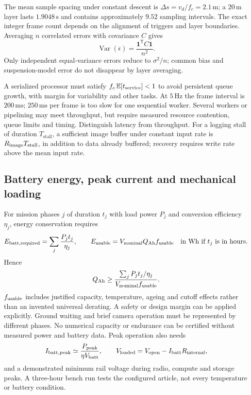 The mean sample spacing under constant descent is
$\Delta s=v_d/f_c=2.1\,\mathrm m$; a $20\,\mathrm m$ layer lasts
$1.9048\,\mathrm s$ and contains approximately $9.52$ sampling intervals.
The exact integer frame count depends on the alignment of triggers and
layer boundaries. Averaging $n$ correlated errors with covariance $C$
gives
\begin{equation}
 \operatorname{Var}(\overline\epsilon)=\frac{\boldsymbol1^{\mathsf T}C\boldsymbol1}{n^2}.
\end{equation}
Only independent equal-variance errors reduce to $\sigma^2/n$; common
bias and suspension-model error do not disappear by layer averaging.

A serialized processor must satisfy $f_c\,\mathbb E[t_{\rm service}]<1$
to avoid persistent queue growth, with margin for variability and other
tasks. At $5\,\mathrm{Hz}$ the frame interval is $200\,\mathrm{ms}$;
$250\,\mathrm{ms}$ per frame is too slow for one sequential worker.
Several workers or pipelining may meet throughput, but require measured
resource contention, queue limits and timing. Distinguish latency from
throughput. For a logging stall of duration $T_{\mathrm{stall}}$, a sufficient
image buffer under constant input rate is $R_{\rm image}T_{\mathrm{stall}}$,
in addition to data already buffered; recovery requires write rate above
the mean input rate.

\subsection{Battery energy, peak current and mechanical loading}

For mission phases $j$ of duration $t_j$ with load power $P_j$ and
conversion efficiency $\eta_j$, energy conservation requires
\begin{equation}
 E_{\rm batt,required}=\sum_j\frac{P_jt_j}{\eta_j},\qquad
 E_{\rm usable}=V_{\rm nominal}Q_{\rm Ah}f_{\rm usable}
 \quad\text{in Wh if $t_j$ is in hours}.
\end{equation}
Hence
\begin{equation}
 Q_{\rm Ah}\geq\frac{\sum_j P_jt_j/\eta_j}
                    {V_{\rm nominal}f_{\rm usable}}.
\end{equation}
$f_{\rm usable}$ includes justified capacity, temperature, ageing and
cutoff effects rather than an invented universal derating. A safety or
design margin can be applied explicitly. Ground waiting and brief camera
operation must be represented by different phases. No numerical capacity
or endurance can be certified without measured power and battery data.
Peak operation also needs
\begin{equation}
 I_{\rm batt,peak}\simeq\frac{P_{\rm peak}}{\eta V_{\rm batt}},\qquad
 V_{\rm loaded}=V_{\rm open}-I_{\rm batt}R_{\rm internal},
\end{equation}
and a demonstrated minimum rail voltage during radio, compute and storage
peaks. A three-hour bench run tests the configured article, not every
temperature or battery condition.

